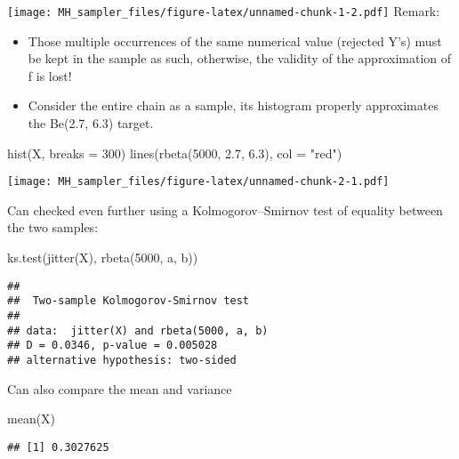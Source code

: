 \documentclass[
]{article}
\newenvironment{Shaded}{\begin{snugshade}}{\end{snugshade}}
\newcommand{\AttributeTok}[1]{\textcolor[rgb]{0.77,0.63,0.00}{#1}}
\newcommand{\DecValTok}[1]{\textcolor[rgb]{0.00,0.00,0.81}{#1}}
\newcommand{\FloatTok}[1]{\textcolor[rgb]{0.00,0.00,0.81}{#1}}
\newcommand{\FunctionTok}[1]{\textcolor[rgb]{0.00,0.00,0.00}{#1}}
\newcommand{\NormalTok}[1]{#1}
\newcommand{\StringTok}[1]{\textcolor[rgb]{0.31,0.60,0.02}{#1}}
\providecommand{\tightlist}{%
  \setlength{\itemsep}{0pt}\setlength{\parskip}{0pt}}
\begin{document}
\texttt{[image: MH\_sampler\_files/figure-latex/unnamed-chunk-1-2.pdf]}
Remark:

\begin{itemize}
\tightlist
\item
  Those multiple occurrences of the same numerical value (rejected Y's)
  must be kept in the sample as such, otherwise, the validity of the
  approximation of f is lost!
\item
  Consider the entire chain as a sample, its histogram properly
  approximates the Be(2.7, 6.3) target.
\end{itemize}

\begin{Shaded}
\begin{Highlighting}[]
\FunctionTok{hist}\NormalTok{(X, }\AttributeTok{breaks =} \DecValTok{300}\NormalTok{)}
\FunctionTok{lines}\NormalTok{(}\FunctionTok{rbeta}\NormalTok{(}\DecValTok{5000}\NormalTok{, }\FloatTok{2.7}\NormalTok{, }\FloatTok{6.3}\NormalTok{), }\AttributeTok{col =} \StringTok{"red"}\NormalTok{)}
\end{Highlighting}
\end{Shaded}

\texttt{[image: MH\_sampler\_files/figure-latex/unnamed-chunk-2-1.pdf]}

Can checked even further using a Kolmogorov--Smirnov test of equality
between the two samples:

\begin{Shaded}
\begin{Highlighting}[]
\FunctionTok{ks.test}\NormalTok{(}\FunctionTok{jitter}\NormalTok{(X), }\FunctionTok{rbeta}\NormalTok{(}\DecValTok{5000}\NormalTok{, a, b))}
\end{Highlighting}
\end{Shaded}

\begin{verbatim}
## 
##  Two-sample Kolmogorov-Smirnov test
## 
## data:  jitter(X) and rbeta(5000, a, b)
## D = 0.0346, p-value = 0.005028
## alternative hypothesis: two-sided
\end{verbatim}

Can also compare the mean and variance

\begin{Shaded}
\begin{Highlighting}[]
\FunctionTok{mean}\NormalTok{(X)}
\end{Highlighting}
\end{Shaded}

\begin{verbatim}
## [1] 0.3027625
\end{verbatim}
\end{document}
